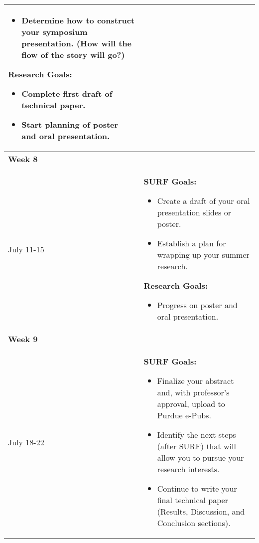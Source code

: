 \documentclass[a4paper]{journal}
\begin{document}
\begin{longtable}{| m{} | p{}|}
\begin{itemize}
                                      \item Determine how to construct your symposium presentation. (How will the flow of the story will go?)
                                    \end{itemize}
                                    \textbf{Research Goals:}
                                    \begin{itemize}
                                      \item Complete first draft of technical paper.
                                      \item Start planning of poster and oral presentation.
                                    \end{itemize}\\
  \hline
  \textbf{Week 8} & \\ July 11-15 &  \textbf{SURF Goals:}
                                    \begin{itemize}
                                      \item Create a draft of your oral presentation slides or poster.
                                      \item Establish a plan for wrapping up your summer research.
                                    \end{itemize}
                                    \textbf{Research Goals:}
                                    \begin{itemize}
                                      \item Progress on poster and oral presentation.
                                    \end{itemize}\\
  \hline
  \textbf{Week 9} & \\ July 18-22 &  \textbf{SURF Goals:}
                                    \begin{itemize}
                                      \item Finalize your abstract and, with professor’s approval, upload to Purdue e-Pubs.
                                      \item Identify the next steps (after SURF) that will allow you to pursue your research interests.
                                      \item Continue to write your final technical paper (Results, Discussion, and Conclusion sections).
                                    \end{itemize}

\end{longtable}
\end{document}
